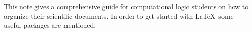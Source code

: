 \documentclass{howto}
\begin{document}
This note gives a comprehensive guide for computational logic students on
how to organize their scientific documents. In order to get started
with \LaTeX\ some useful packages are mentioned.
\appendix
%
%
%
%
%
%
\end{document}
